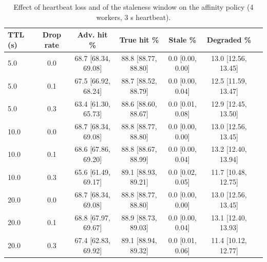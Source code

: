 \begin{table}[t]
\centering
\scriptsize
\setlength{\tabcolsep}{2.5pt}
\caption{Effect of heartbeat loss and of the staleness window on the affinity policy (4 workers, 3 s heartbeat).}
\label{tab:staleness}
\begin{tabular}{lcccccc}
\toprule
TTL (s) & Drop rate & Adv. hit \% & True hit \% & Stale \% & Degraded \% \\
\midrule
5.0 & 0.0 & 68.7 \tiny [68.34, 69.08] & 88.8 \tiny [88.77, 88.80] & 0.0 \tiny [0.00, 0.00] & 13.0 \tiny [12.56, 13.45] \\
5.0 & 0.1 & 67.5 \tiny [66.92, 68.24] & 88.7 \tiny [88.52, 88.79] & 0.0 \tiny [0.00, 0.04] & 12.5 \tiny [11.59, 13.47] \\
5.0 & 0.3 & 63.4 \tiny [61.30, 65.73] & 88.6 \tiny [88.60, 88.67] & 0.0 \tiny [0.01, 0.08] & 12.9 \tiny [12.45, 13.50] \\
10.0 & 0.0 & 68.7 \tiny [68.34, 69.08] & 88.8 \tiny [88.77, 88.80] & 0.0 \tiny [0.00, 0.00] & 13.0 \tiny [12.56, 13.45] \\
10.0 & 0.1 & 68.6 \tiny [67.86, 69.20] & 88.8 \tiny [88.67, 88.99] & 0.0 \tiny [0.00, 0.04] & 13.2 \tiny [12.40, 13.94] \\
10.0 & 0.3 & 65.6 \tiny [61.49, 69.17] & 89.1 \tiny [88.93, 89.21] & 0.0 \tiny [0.02, 0.05] & 11.7 \tiny [10.48, 12.75] \\
20.0 & 0.0 & 68.7 \tiny [68.34, 69.08] & 88.8 \tiny [88.77, 88.80] & 0.0 \tiny [0.00, 0.00] & 13.0 \tiny [12.56, 13.45] \\
20.0 & 0.1 & 68.8 \tiny [67.97, 69.67] & 88.9 \tiny [88.73, 89.03] & 0.0 \tiny [0.00, 0.04] & 13.1 \tiny [12.40, 13.93] \\
20.0 & 0.3 & 67.4 \tiny [62.83, 69.92] & 89.1 \tiny [88.94, 89.32] & 0.0 \tiny [0.01, 0.06] & 11.4 \tiny [10.12, 12.77] \\
\bottomrule
\end{tabular}
\end{table}
